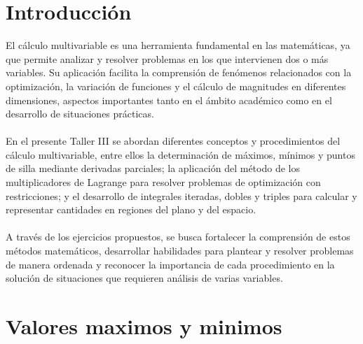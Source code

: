 \documentclass[12pt,a4paper]{report}
\begin{document}
\chapter*{Introducción}
El cálculo multivariable es una herramienta fundamental en las matemáticas, ya que permite analizar y resolver problemas en los que intervienen dos o más variables. Su aplicación facilita la comprensión de fenómenos relacionados con la optimización, la variación de funciones y el cálculo de magnitudes en diferentes dimensiones, aspectos importantes tanto en el ámbito académico como en el desarrollo de situaciones prácticas. \\
\\
En el presente Taller III se abordan diferentes conceptos y procedimientos del cálculo multivariable, entre ellos la determinación de máximos, mínimos y puntos de silla mediante derivadas parciales; la aplicación del método de los multiplicadores de Lagrange para resolver problemas de optimización con restricciones; y el desarrollo de integrales iteradas, dobles y triples para calcular y representar cantidades en regiones del plano y del espacio.\\
\\
A través de los ejercicios propuestos, se busca fortalecer la comprensión de estos métodos matemáticos, desarrollar habilidades para plantear y resolver problemas de manera ordenada y reconocer la importancia de cada procedimiento en la solución de situaciones que requieren análisis de varias variables.
\newpage

\chapter{Valores maximos y minimos}
\end{document}
